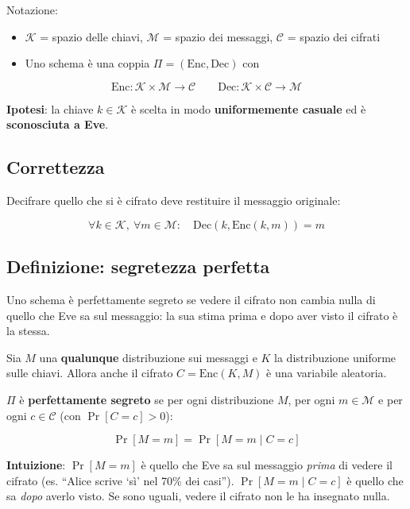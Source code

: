 Notazione:

\begin{itemize}
\tightlist
\item
  \(\mathcal{K}\) = spazio delle chiavi, \(\mathcal{M}\) = spazio dei messaggi, \(\mathcal{C}\) = spazio dei cifrati
\item
  Uno schema è una coppia \(\Pi = (\text{Enc}, \text{Dec})\) con
\end{itemize}

\[
\text{Enc}: \mathcal{K} \times \mathcal{M} \to \mathcal{C} \qquad \text{Dec}: \mathcal{K} \times \mathcal{C} \to \mathcal{M}
\]

\textbf{Ipotesi}: la chiave \(k \in \mathcal{K}\) è scelta in modo \textbf{uniformemente casuale} ed è \textbf{sconosciuta a Eve}.

\subsection{Correttezza}

Decifrare quello che si è cifrato deve restituire il messaggio originale:

\[
\forall k \in \mathcal{K},\ \forall m \in \mathcal{M}: \quad \text{Dec}(k, \text{Enc}(k, m)) = m
\]

\subsection{Definizione: segretezza perfetta}

\begin{inbreve}

Uno schema è perfettamente segreto se vedere il cifrato non cambia nulla di quello che Eve sa sul messaggio: la sua stima prima e dopo aver visto il cifrato è la stessa.

\end{inbreve}

Sia \(M\) una \textbf{qualunque} distribuzione sui messaggi e \(K\) la distribuzione uniforme sulle chiavi. Allora anche il cifrato \(C = \text{Enc}(K, M)\) è una variabile aleatoria.

\(\Pi\) è \textbf{perfettamente segreto} se per ogni distribuzione \(M\), per ogni \(m \in \mathcal{M}\) e per ogni \(c \in \mathcal{C}\) (con \(\Pr[C=c] > 0\)):

\[
\Pr[M = m] = \Pr[M = m \mid C = c]
\]

\textbf{Intuizione}: \(\Pr[M = m]\) è quello che Eve sa sul messaggio \emph{prima} di vedere il cifrato (es. ``Alice scrive `sì' nel 70\% dei casi''). \(\Pr[M = m \mid C = c]\) è quello che sa \emph{dopo} averlo visto. Se sono uguali, vedere il cifrato non le ha insegnato nulla.

